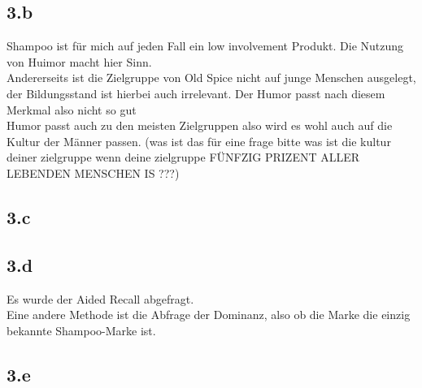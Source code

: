 \subsection{3.b}
    Shampoo ist für mich auf jeden Fall ein low involvement Produkt. Die Nutzung von Huimor macht hier Sinn. \\
    Andererseits ist die Zielgruppe von Old Spice nicht auf junge Menschen ausgelegt, der Bildungsstand ist hierbei auch irrelevant. Der Humor passt nach diesem Merkmal also nicht so gut\\
    Humor passt auch zu den meisten Zielgruppen also wird es wohl auch auf die Kultur der Männer passen. (was ist das für eine frage bitte was ist die kultur deiner zielgruppe wenn deine zielgruppe FÜNFZIG PRIZENT ALLER LEBENDEN MENSCHEN IS ???)

\subsection{3.c}

\subsection{3.d}
    Es wurde der Aided Recall abgefragt. \\
    Eine andere Methode ist die Abfrage der Dominanz, also ob die Marke die einzig bekannte Shampoo-Marke ist.

\subsection{3.e}
